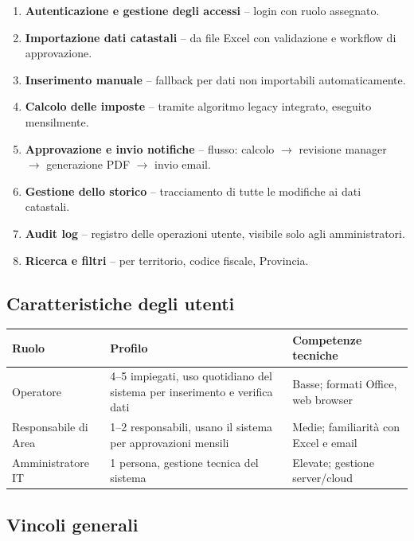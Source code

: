 \documentclass[12pt, a4paper]{article}
\begin{document}
\begin{enumerate}
  \item \textbf{Autenticazione e gestione degli accessi} -- login con ruolo assegnato.
  \item \textbf{Importazione dati catastali} -- da file Excel con validazione e workflow di approvazione.
  \item \textbf{Inserimento manuale} -- fallback per dati non importabili automaticamente.
  \item \textbf{Calcolo delle imposte} -- tramite algoritmo legacy integrato, eseguito mensilmente.
  \item \textbf{Approvazione e invio notifiche} -- flusso: calcolo $\to$ revisione manager $\to$ generazione PDF $\to$ invio email.
  \item \textbf{Gestione dello storico} -- tracciamento di tutte le modifiche ai dati catastali.
  \item \textbf{Audit log} -- registro delle operazioni utente, visibile solo agli amministratori.
  \item \textbf{Ricerca e filtri} -- per territorio, codice fiscale, Provincia.
\end{enumerate}

\subsection{Caratteristiche degli utenti}

\begin{tabularx}{\textwidth}{lXX}
  \toprule
  \textbf{Ruolo} & \textbf{Profilo} & \textbf{Competenze tecniche} \\
  \midrule
  Operatore & 4--5 impiegati, uso quotidiano del sistema per inserimento e verifica dati & Basse; formati Office, web browser \\
  \addlinespace
  Responsabile di Area & 1--2 responsabili, usano il sistema per approvazioni mensili & Medie; familiarità con Excel e email \\
  \addlinespace
  Amministratore IT & 1 persona, gestione tecnica del sistema & Elevate; gestione server/cloud \\
  \bottomrule
\end{tabularx}

\subsection{Vincoli generali}
\end{document}
